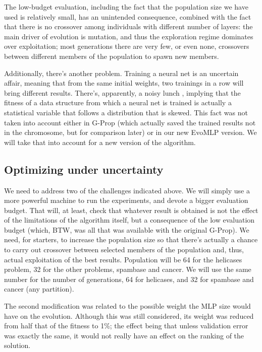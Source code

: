 \documentclass[runningheads]{llncs}
\begin{document}
The low-budget evaluation, including the fact that the population size
we have used is relatively small, has an unintended consequence,
combined with the fact that there is no crossover among individuals
with different number of layers: the main driver of evolution is
mutation, and thus the exploration regime dominates over exploitation;
most generations there are very few, or even none, crossovers between
different members of the population to spawn new members.

Additionally, there's another problem. Training a neural net is an
uncertain affair, meaning that from the same initial weights, two
trainings in a row will bring different results. There's, apparently,
a noisy lunch \cite{DBLP:conf/ijcci/MereloLFGCCRMG15}, implying
that the fitness of a data structure from which a neural net is
trained is actually a statistical variable that follows a distribution
that is skewed. This fact was not taken into account either in G-Prop
(which actually saved the trained results not in the chromosome, but
for comparison later) or in our new EvoMLP version. We will take that
into account for a new version of the algorithm.

\subsection{Optimizing under uncertainty}

We need to address two of the challenges indicated above. We will
simply use a more powerful machine to run the experiments, and devote
a bigger evaluation budget. That will, at least, check that whatever
result is obtained is not the effect of the limitations of the
algorithm itself, but a consequence of the low evaluation budget
(which, BTW, was all that was available with the original G-Prop). We
need, for starters, to increase the population size so that there's
actually a chance to carry out crossover between selected members of
the population and, thus, actual exploitation of the best
results. Population will be 64 for the helicases problem, 32 for the
other problems, spambase and cancer. We will use the same number for
the number of generations, 64 for helicases, and 32 for spambase and
cancer (any partition).

The second modification was related to the possible weight the MLP
size would have on the evolution. Although this was still considered,
its weight was reduced from half that of the fitness to 1\%; the
effect being that unless validation error was exactly the same, it
would not really have an effect on the ranking of the solution.
\end{document}
